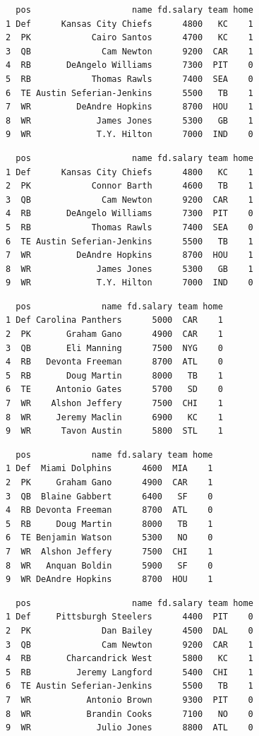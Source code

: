 \documentclass[10pt]{article}
\begin{document}
\begin{lstlisting}
  pos                    name fd.salary team home
1 Def      Kansas City Chiefs      4800   KC    1
2  PK            Cairo Santos      4700   KC    1
3  QB              Cam Newton      9200  CAR    1
4  RB       DeAngelo Williams      7300  PIT    0
5  RB            Thomas Rawls      7400  SEA    0
6  TE Austin Seferian-Jenkins      5500   TB    1
7  WR         DeAndre Hopkins      8700  HOU    1
8  WR             James Jones      5300   GB    1
9  WR             T.Y. Hilton      7000  IND    0
\end{lstlisting}

\begin{lstlisting}
  pos                    name fd.salary team home
1 Def      Kansas City Chiefs      4800   KC    1
2  PK            Connor Barth      4600   TB    1
3  QB              Cam Newton      9200  CAR    1
4  RB       DeAngelo Williams      7300  PIT    0
5  RB            Thomas Rawls      7400  SEA    0
6  TE Austin Seferian-Jenkins      5500   TB    1
7  WR         DeAndre Hopkins      8700  HOU    1
8  WR             James Jones      5300   GB    1
9  WR             T.Y. Hilton      7000  IND    0
\end{lstlisting}

\begin{lstlisting}
  pos              name fd.salary team home
1 Def Carolina Panthers      5000  CAR    1
2  PK       Graham Gano      4900  CAR    1
3  QB       Eli Manning      7500  NYG    0
4  RB   Devonta Freeman      8700  ATL    0
5  RB       Doug Martin      8000   TB    1
6  TE     Antonio Gates      5700   SD    0
7  WR    Alshon Jeffery      7500  CHI    1
8  WR     Jeremy Maclin      6900   KC    1
9  WR      Tavon Austin      5800  STL    1
\end{lstlisting}

\begin{lstlisting}
  pos            name fd.salary team home
1 Def  Miami Dolphins      4600  MIA    1
2  PK     Graham Gano      4900  CAR    1
3  QB  Blaine Gabbert      6400   SF    0
4  RB Devonta Freeman      8700  ATL    0
5  RB     Doug Martin      8000   TB    1
6  TE Benjamin Watson      5300   NO    0
7  WR  Alshon Jeffery      7500  CHI    1
8  WR   Anquan Boldin      5900   SF    0
9  WR DeAndre Hopkins      8700  HOU    1
\end{lstlisting}

\begin{lstlisting}
  pos                    name fd.salary team home
1 Def     Pittsburgh Steelers      4400  PIT    0
2  PK              Dan Bailey      4500  DAL    0
3  QB              Cam Newton      9200  CAR    1
4  RB       Charcandrick West      5800   KC    1
5  RB         Jeremy Langford      5400  CHI    1
6  TE Austin Seferian-Jenkins      5500   TB    1
7  WR           Antonio Brown      9300  PIT    0
8  WR           Brandin Cooks      7100   NO    0
9  WR             Julio Jones      8800  ATL    0
\end{lstlisting}
\end{document}
